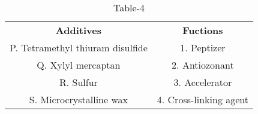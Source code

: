 \begin{table}[htbp]
  \centering
  \caption{Table-4}
  \label{tab:tables/table4.tex}
  \begin{tabular}{cc}
\textbf{Additives} & \textbf{Fuctions} \\

P. Tetramethyl thiuram disulfide & 1. Peptizer \\
Q. Xylyl mercaptan & 2. Antiozonant\\
R. Sulfur & 3. Accelerator \\
S. Microcrystalline wax & 4. Cross-linking agent \\
  
  
  
  \end{tabular}
\end{table}







